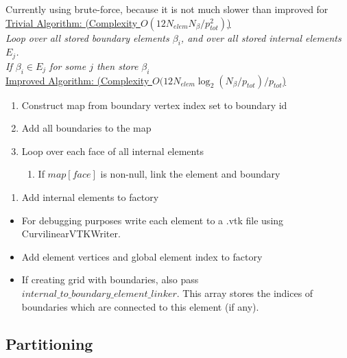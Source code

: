 \begin{mybox}
\noindent
Currently using brute-force, because it is not much slower than improved for \\

\noindent
\uline{Trivial Algorithm: (Complexity $O(12 N_{elem} N_{\beta} / p_{tot}^2)$)}\\
\textit{Loop over all stored boundary elements $\beta_i$, and over all stored internal elements $E_j$.} \\
\textit{ If $\beta_i \in E_j$ for some $j$ then store $\beta_i$ }\\

\noindent
\uline{Improved Algorithm: (Complexity $O(12 N_{elem} \log_2 (N_{\beta} / p_{tot}) / p_{tot}$)}\\

\begin{enumerate}
	\item Construct map from boundary vertex index set to boundary id
	\item Add all boundaries to the map
	\item Loop over each face of all internal elements
	\begin{enumerate}
		\item If $map[face]$ is non-null, link the element and boundary
	\end{enumerate}
\end{enumerate}

\end{mybox}	
		
\begin{enumerate}[resume]
	\item Add internal elements to factory
\end{enumerate}
\begin{mybox}
	\begin{itemize}
		\item For debugging purposes write each element to a .vtk file using CurvilinearVTKWriter.
		\item Add element vertices and global element index to factory
		\item If creating grid with boundaries, also pass $internal\_to\_boundary\_element\_linker$. This array stores the indices of boundaries which are connected to this element (if any).
	\end{itemize}
\end{mybox}







\subsection{Partitioning}